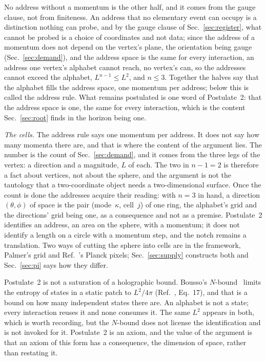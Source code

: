 \documentclass[aps,prd,twocolumn,superscriptaddress,nofootinbib]{revtex4-2}
\begin{document}
No address without a momentum is the other half, and it comes from the gauge clause, not from finiteness. An address that no elementary event can occupy is a distinction nothing can probe, and by the gauge clause of Sec.~\ref{sec:register}, what cannot be probed is a choice of coordinates and not data; since the address of a momentum does not depend on the vertex's plane, the orientation being gauge (Sec.~\ref{sec:demand}), and the address space is the same for every interaction, an address one vertex's alphabet cannot reach, no vertex's can, so the addresses cannot exceed the alphabet, $L^{n-1} \le L^2$, and $n \le 3$. Together the halves say that the alphabet fills the address space, one momentum per address; below this is called the address rule. What remains postulated is one word of Postulate~2: that the address space is one, the same for every interaction, which is the content Sec.~\ref{sec:root} finds in the horizon being one.

\textit{The cells.} The address rule says one momentum per address. It does not say how many momenta there are, and that is where the content of the argument lies. The number is the count of Sec.~\ref{sec:demand}, and it comes from the three legs of the vertex: a direction and a magnitude, $L$ of each. The two in $n-1 = 2$ is therefore a fact about vertices, not about the sphere, and the argument is not the tautology that a two-coordinate object needs a two-dimensional surface. Once the count is done the addresses acquire their reading: with $n = 3$ in hand, a direction $(\theta,\phi)$ of space is the pair (mode~$\kappa$, cell~$j$) of one ring, the alphabet's grid and the directions' grid being one, as a consequence and not as a premise. Postulate~2 identifies an address, an area on the sphere, with a momentum; it does not identify a length on a circle with a momentum step, and the notch remains a translation. Two ways of cutting the sphere into cells are in the framework, Palmer's grid and Ref.~\cite{korytko2026}'s Planck pixels; Sec.~\ref{sec:supply} constructs both and Sec.~\ref{sec:pi} says how they differ.

Postulate~2 is not a saturation of a holographic bound. Bousso's $N$-bound~\cite{bousso2000} limits the entropy of states in a static patch to $L^2/4\pi$ (Ref.~\cite{korytko2026c}, Eq.~17), and that is a bound on how many independent states there are. An alphabet is not a state; every interaction reuses it and none consumes it. The same $L^2$ appears in both, which is worth recording, but the $N$-bound does not license the identification and is not invoked for it. Postulate~2 is an axiom, and the value of the argument is that an axiom of this form has a consequence, the dimension of space, rather than restating it.
\end{document}
